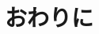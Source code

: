 \documentclass[12pt,a4j]{jreport}
\begin{document}
\chapter{おわりに}

\renewcommand{\bibname}{参考文献}


\renewcommand{\em}{\it}%



\end{document}
